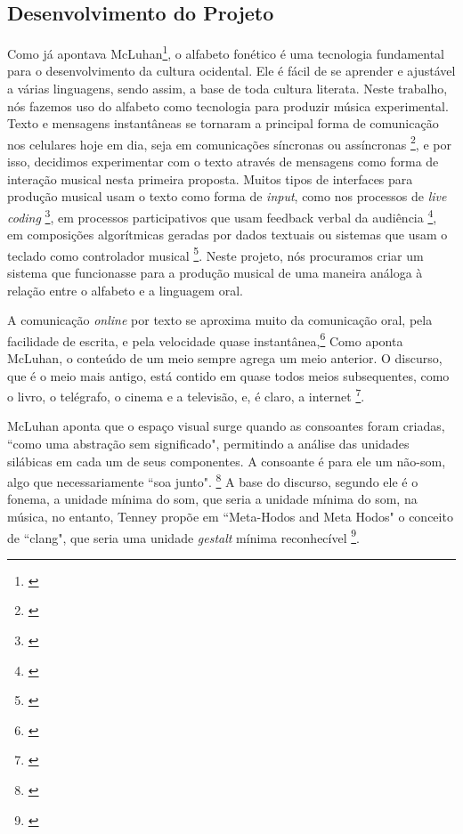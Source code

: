 \subsection{Desenvolvimento do Projeto}
Como já apontava McLuhan\footnote{\cite{mcluhan1968comunicaccoes}}, o alfabeto fonético é uma tecnologia fundamental para o desenvolvimento da cultura ocidental. Ele é fácil de se aprender e ajustável a várias linguagens, sendo assim, a base de toda cultura literata. Neste trabalho, nós fazemos uso do alfabeto como tecnologia para produzir música experimental. Texto e mensagens instantâneas se tornaram a principal forma de comunicação nos celulares hoje em dia, seja em comunicações síncronas ou assíncronas \footnote{\cite{Madell:2007}}, e por isso, decidimos experimentar com  o texto através de mensagens como forma de interação musical nesta primeira proposta. Muitos tipos de interfaces para produção musical usam o texto como forma de \emph{input}, como nos processos de \emph{live coding} \footnote{\cite{Collins2003}}, em processos participativos que usam feedback verbal da audiência \footnote{\cite{noauthor_transglasphone_nodate}}, em composições algorítmicas geradas por dados textuais ou sistemas que usam o teclado como controlador musical \footnote{\cite{Fiebrink2007}}. Neste projeto, nós procuramos criar um sistema que funcionasse para a produção musical de uma maneira análoga à relação entre o alfabeto e a linguagem oral.

A comunicação \emph{online} por texto se aproxima muito da comunicação oral, pela facilidade de escrita, e pela velocidade quase instantânea,\footnote{\cite[33]{Levinson2001}} Como aponta McLuhan, o conteúdo de um meio sempre agrega um meio anterior. O discurso, que é o meio mais antigo, está contido em quase todos meios subsequentes, como o livro, o telégrafo, o cinema e a televisão, e, é claro, a internet \footnote{\cite[42]{Levinson2001}}. 

McLuhan aponta que o espaço visual surge quando as consoantes foram criadas, ``como uma abstração sem significado", permitindo a análise das unidades silábicas em cada um de seus componentes. A consoante é para ele um não-som, algo que necessariamente ``soa junto". \footnote{\cite[13-14]{mcluhan1968comunicaccoes}} A base do discurso, segundo ele é o fonema, a unidade mínima do som, que seria a unidade mínima do som, na música, no entanto, Tenney  propõe em ``Meta-Hodos and Meta Hodos" o conceito de ``clang", que seria uma unidade \emph{gestalt} mínima reconhecível \footnote{\cite[23]{Tenney1988}}. 

